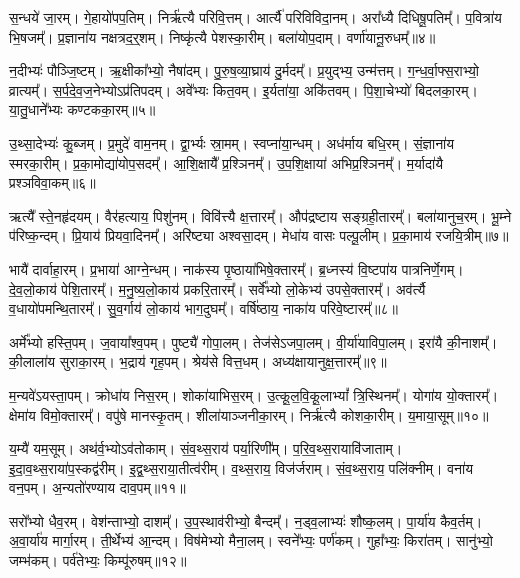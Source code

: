 स॒न्धये॑ जा॒रम्।
गे॒हायो॑पप॒तिम्।
निर्\mbox{}ऋ॑त्यै परिवि॒त्तम्।
आर्त्यै॑ परिविविदा॒नम्।
अरा᳚ध्यै दिधिषू॒पतिम्᳚।
प॒वित्रा॑य भि॒षजम्᳚।
प्र॒ज्ञाना॑य नक्षत्रद॒र्॒शम्।
निष्कृ॑त्यै पेशस्का॒रीम्।
बला॑योप॒दाम्।
वर्णा॑यानू॒रुधम्᳚॥४॥\ip

न॒दीभ्यः॑ पौञ्जि॒ष्टम्।
ऋ॒क्षीका᳚भ्यो॒ नैषा॑दम्।
पु॒रु॒ष॒व्या॒घ्राय॑ दु॒र्मदम्᳚।
प्र॒युद्भ्य॒ उन्म॑त्तम्।
ग॒न्ध॒र्वा॒फ्स॒राभ्यो॒ व्रात्यम्᳚।
स॒र्प॒दे॒व॒\-ज॒नेभ्यो\-ऽप्र॑तिपदम्।
अवे᳚भ्यः कित॒वम्।
इ॒र्यता॑या॒ अकि॑तवम्।
पि॒शा॒चेभ्यो॑ बिदलका॒रम्।
या॒तु॒धाने᳚भ्यः कण्टकका॒रम्॥५॥\ip

उ॒थ्सा॒देभ्यः॑ कु॒ब्जम्।
प्र॒मुदे॑ वाम॒नम्।
द्वा॒र्भ्यः स्रा॒मम्।
स्वप्ना॑या॒न्धम्।
अध॑र्माय बधि॒रम्।
सं॒ज्ञाना॑य स्मरका॒रीम्।
प्र॒का॒मोद्या॑योप॒सदम्᳚।
आ॒शि॒क्षायै᳚ प्र॒श्ञिनम्᳚।
उ॒प॒शि॒क्षाया॑ अभिप्र॒श्ञिनम्᳚।
म॒र्यादा॑यै प्रश्ञविवा॒कम्॥६॥\ip

ऋत्यै᳚ स्ते॒नहृ॑दयम्।
वैर॑हत्याय॒ पिशु॑नम्।
विवि॑त्त्यै क्ष॒त्तारम्᳚।
औप॑द्रष्टाय सङ्ग्रही॒तारम्᳚।
बला॑यानुच॒रम्।
भू॒म्ने प॑रिष्क॒न्दम्।
प्रि॒याय॑ प्रियवा॒दिनम्᳚।
अरि॑ष्ट्या अश्वसा॒दम्।
मेधा॑य वासः पल्पू॒लीम्।
प्र॒का॒माय॑ रजयि॒त्रीम्॥७॥\ip

भायै॑ दार्वाहा॒रम्।
प्र॒भाया॑ आग्ने॒न्धम्।
नाक॑स्य पृ॒ष्ठाया॑भि\-षे॒क्तारम्᳚।
ब्र॒ध्नस्य॑ वि॒ष्टपा॑य पात्रनिर्णे॒गम्।
दे॒व॒लो॒काय॑ पेशि॒तारम्᳚।
म॒नु॒ष्य॒लो॒काय॑ प्रकरि॒तारम्᳚।
सर्वे᳚भ्यो लो॒केभ्य॑ उपसे॒क्तारम्᳚।
अव॑र्त्यै व॒धायो॑पमन्थि॒तारम्᳚।
सु॒व॒र्गाय॑ लो॒काय॑ भाग॒दुघम्᳚।
वर्\mbox{}षि॑ष्ठाय॒ नाका॑य परिवे॒ष्टारम्᳚॥८॥\ip

अर्मे᳚भ्यो हस्ति॒पम्।
ज॒वाया᳚श्व॒पम्।
पुष्ट्यै॑ गोपा॒लम्।
तेज॑से\-ऽजपा॒लम्।
वी॒र्या॑याविपा॒लम्।
इरा॑यै की॒नाशम्᳚।
की॒लाला॑य सुराका॒रम्।
भ॒द्राय॑ गृह॒पम्।
श्रेय॑से वित्त॒धम्।
अध्य॑क्षायानुक्ष॒त्तारम्᳚॥९॥\ip

म॒न्यवे॑\-ऽयस्ता॒पम्।
क्रोधा॑य निस॒रम्।
शोका॑याभिस॒रम्।
उ॒त्कू॒ल॒वि॒कू॒लाभ्यां᳚ त्रि॒स्थिनम्᳚।
योगा॑य यो॒क्तारम्᳚।
क्षेमा॑य विमो॒क्तारम्᳚।
वपु॑षे मानस्कृ॒तम्।
शीला॑याञ्जनीका॒रम्।
निर्\mbox{}ऋ॑त्यै कोशका॒रीम्।
य॒माया॒सूम्॥१०॥\ip

य॒म्यै॑ यम॒सूम्।
अथ॑र्व॒भ्यो\-ऽव॑तोकाम्।
सं॒व॒थ्स॒राय॑ पर्या॒रिणी᳚म्।
प॒रि॒व॒थ्स॒राया\-वि॑जाताम्।
इ॒दा॒व॒थ्स॒राया॑प॒\-स्कद्व॑रीम्।
इ॒द्व॒थ्स॒राया॒तीत्व॑रीम्।
व॒थ्स॒राय॒ विज॑र्जराम्।
सं॒व॒थ्स॒राय॒ पलि॑क्नीम्।
वना॑य वन॒पम्।
अ॒न्यतो॑रण्याय दाव॒पम्॥११॥\ip

सरो᳚भ्यो धैव॒रम्।
वेश॑न्ताभ्यो॒ दाशम्᳚।
उ॒प॒स्थाव॑रीभ्यो॒ बैन्दम्᳚।
न॒ड्व॒लाभ्यः॑ शौष्क॒लम्।
पा॒र्या॑य कैव॒र्तम्।
अ॒वा॒र्या॑य मार्गा॒रम्।
ती॒र्थेभ्य॑ आ॒न्दम्।
विष॑मेभ्यो मैना॒लम्।
स्वने᳚भ्यः॒ पर्ण॑कम्।
गुहा᳚भ्यः॒ किरा॑तम्।
सानु॑भ्यो॒ जम्भ॑कम्।
पर्व॑तेभ्यः॒ किम्पू॑रुषम्॥१२॥\ip

